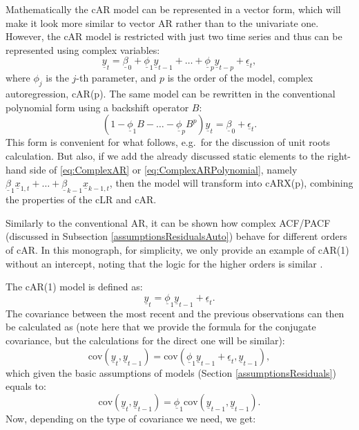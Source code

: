 \documentclass[
]{book}
\begin{document}
Mathematically the cAR model can be represented in a vector form, which will make it look more similar to vector AR rather than to the univariate one. However, the cAR model is restricted with just two time series and thus can be represented using complex variables:
\begin{equation}
    \underline{y}_t = \underline{\beta}_0 + \underline{\phi}_1 \underline{y}_{t-1} + \dots + \underline{\phi}_p \underline{y}_{t-p} + \underline{\epsilon}_t ,
    \label{eq:ComplexAR}
\end{equation}
where \(\phi_j\) is the \(j\)-th parameter, and \(p\) is the order of the model, complex autoregression, cAR(p). The same model can be rewritten in the conventional polynomial form using a backshift operator \(B\):
\begin{equation}
    \left(1 - \underline{\phi}_1 B - \dots - \underline{\phi}_p B^p \right) \underline{y}_t  = \underline{\beta}_0 + \underline{\epsilon}_t .
    \label{eq:ComplexARPolynomial}
\end{equation}
This form is convenient for what follows, e.g.~for the discussion of unit roots calculation. But also, if we add the already discussed static elements to the right-hand side of \eqref{eq:ComplexAR} or \eqref{eq:ComplexARPolynomial}, namely \(\underline{\beta}_1 \underline{x}_{1,t} + \dots + \underline{\beta}_{k-1} \underline{x}_{k-1,t}\), then the model will transform into cARX(p), combining the properties of the cLR and cAR.

Similarly to the conventional AR, it can be shown how complex ACF/PACF (discussed in Subsection \ref{assumptionsResidualsAuto}) behave for different orders of cAR. In this monograph, for simplicity, we only provide an example of cAR(1) without an intercept, noting that the logic for the higher orders is similar \citep[ has similar derivations for the real-valued AR(p) in Section 8.3]{SvetunkovAdam}.

The cAR(1) model is defined as:
\begin{equation}
    \underline{y}_t = \underline{\phi}_1 \underline{y}_{t-1} + \underline{\epsilon}_t .
    \label{eq:ComplexAR1Step1}
\end{equation}
The covariance between the most recent and the previous observations can then be calculated as (note here that we provide the formula for the conjugate covariance, but the calculations for the direct one will be similar):
\begin{equation}
    \mathrm{cov} \left(\underline{y}_t, \underline{y}_{t-1} \right) = \mathrm{cov} \left(\underline{\phi}_1 \underline{y}_{t-1} + \underline{\epsilon}_t, \underline{y}_{t-1} \right) ,
    \label{eq:ComplexAR1Step2}
\end{equation}
which given the basic assumptions of models (Section \ref{assumptionsResiduals}) equals to:
\begin{equation}
    \mathrm{cov} \left(\underline{y}_t, \underline{y}_{t-1} \right) = \underline{\phi}_1 \mathrm{cov} \left( \underline{y}_{t-1}, \underline{y}_{t-1} \right) .
    \label{eq:ComplexAR1Step3}
\end{equation}
Now, depending on the type of covariance we need, we get:
\end{document}
